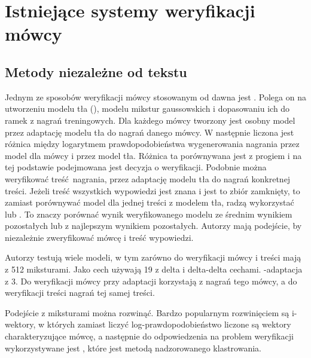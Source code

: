 
\section{Istniejące systemy weryfikacji mówcy}\label{sec:istniejace_systemy}

\subsection{Metody niezależne od tekstu}

Jednym ze sposobów weryfikacji mówcy stosowanym od dawna jest . Polega on na utworzeniu modelu tła
(), modelu mikstur gaussowskich i dopasowaniu ich do ramek  z nagrań
treningowych. Dla każdego mówcy tworzony jest osobny model przez  adaptację modelu tła do nagrań danego
mówcy. W \cite{utteranceVerificationFor}
następnie liczona jest różnica między logarytmem prawdopodobieństwa wygenerowania nagrania przez model
dla mówcy i przez model tła. Różnica ta porównywana jest z progiem i na tej podstawie podejmowana jest decyzja
o weryfikacji. Podobnie można weryfikować treść nagrania, przez adaptację modelu tła do nagrań konkretnej treści.
Jeżeli treść wszystkich wypowiedzi jest znana i jest to zbiór zamknięty, to zamiast porównywać model dla jednej
treści z modelem tła, radzą wykorzystać  lub . To znaczy porównać wynik weryfikowanego
modelu ze średnim wynikiem pozostałych lub z najlepszym wynikiem pozostałych. Autorzy mają podejście, by niezależnie
zweryfikować mówcę i treść wypowiedzi.

Autorzy testują wiele modeli, w tym zarówno do weryfikacji mówcy i treści mają  z 512 miksturami.
Jako cech używają 19  z delta i delta-delta cechami. -adaptacja z  3.
Do weryfikacji mówcy przy adaptacji korzystają z nagrań tego mówcy, a do weryfikacji treści nagrań tej samej treści.

Podejście z miksturami można rozwinąć. Bardzo popularnym rozwinięciem są i-wektory, w których
zamiast liczyć log-prawdopodobieństwo liczone są wektory charakteryzujące mówcę, a następnie do
odpowiedzenia na problem weryfikacji wykorzystywane
jest , które jest metodą nadzorowanego klastrowania.

